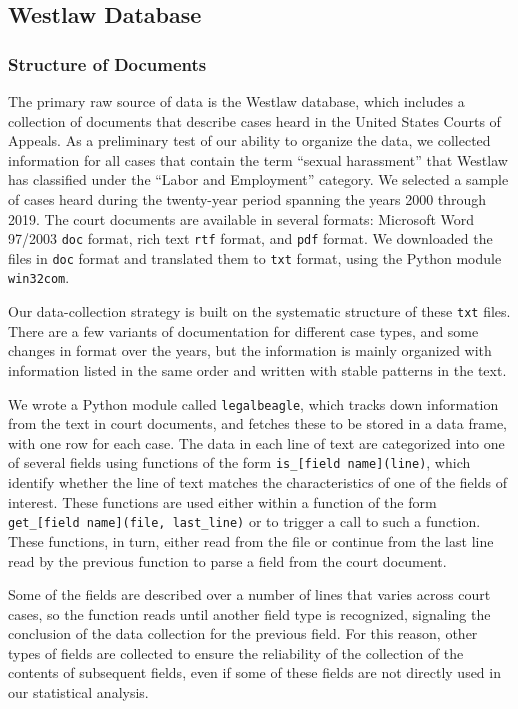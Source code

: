 \documentclass[11pt]{paper}
\begin{document}
\subsection*{Westlaw Database}

\subsubsection*{Structure of Documents}

The primary raw source of data is the Westlaw database, which includes a 
collection of documents that describe cases heard in the United States Courts 
of Appeals. 
As a preliminary test of our ability to organize the data, we collected 
information for all cases that contain the term ``sexual harassment'' that 
Westlaw has classified under the ``Labor and Employment'' category. 
We selected a sample of cases heard during the twenty-year period spanning 
the years 2000 through 2019.  
The court documents are available in several formats: Microsoft Word 97/2003 
\texttt{doc} format, rich text \texttt{rtf} format, and \texttt{pdf} format. 
We downloaded the files in \texttt{doc} format and translated them to 
\texttt{txt} format, using the Python module \texttt{win32com}. 

Our data-collection strategy is built on the systematic structure of these 
\texttt{txt} files. 
There are a few variants of documentation for different case types, and some 
changes in format over the years, but the information is mainly organized with 
information listed in the same order and written with stable patterns in the 
text. 

We wrote a Python module called \texttt{legalbeagle}, which tracks down 
information from the text in court documents, and fetches these to be stored 
in a data frame, with one row for each case. 
The data in each line of text are categorized into one of several fields using 
functions of the form \texttt{is\_[field name](line)}, which identify whether 
the line of text matches the characteristics of one of the fields of interest. 
These functions are used either within a function of the form 
\texttt{get\_[field name](file, last\_line)} or to trigger a call to such 
a function. 
These functions, in turn, either read from the file or continue from the 
last line read by the previous function to parse a field from the court 
document. 

Some of the fields are described over a number of lines that varies across 
court cases, so the function reads until another field type is recognized, 
signaling the conclusion of the data collection for the previous field. 
For this reason, other types of fields are collected to ensure the reliability 
of the collection of the contents of subsequent fields, even if some of these 
fields are not directly used in our statistical analysis. 
\end{document}
